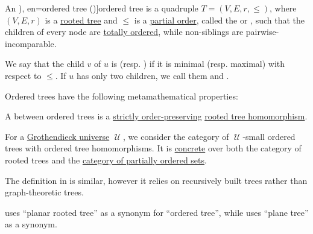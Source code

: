 \begin{definition}\label{def:ordered_tree}\mimprovised
  An \term[ru=упорядоченное дерево (\cite[\S 9.3.5]{Новиков2013ДискретнаяМатематика}), en=ordered tree (\cite[573]{Stanley2012EnumerativeCombinatoricsVol1})]{ordered tree} is a quadruple \( T = (V, E, r, \leq) \), where \( (V, E, r) \) is a \hyperref[def:rooted_tree]{rooted tree} and \( {\leq} \) is a \hyperref[def:partially_ordered_set]{partial order}, called the  or , such that the children of every node are \hyperref[def:partial_order_chain/chain]{totally ordered}, while non-siblings are pairwise-incomparable.

  \begin{thmenum}[series=def:ordered_tree]
     We say that the child \( v \) of \( u \) is  (resp. ) if it is minimal (resp. maximal) with respect to \( {\leq} \). If \( u \) has only two children, we call them  and .
  \end{thmenum}

  Ordered trees have the following metamathematical properties:
  \begin{thmenum}
     A  between ordered trees is a \hyperref[def:order_function/preserving]{strictly order-preserving} \hyperref[def:rooted_tree/homomorphism]{rooted tree homomorphism}.

     For a \hyperref[def:grothendieck_universe]{Grothendieck universe} \( \mscrU \), we consider the category of \( \mscrU \)-small ordered trees with ordered tree homomorphisms. It is \hyperref[def:concrete_category]{concrete} over both the category of rooted trees and the \hyperref[def:partially_ordered_set]{category of partially ordered sets}.
  \end{thmenum}
\end{definition}
\begin{comments}
  \item The definition in \cite[573]{Stanley2012EnumerativeCombinatoricsVol1} is similar, however it relies on recursively built trees rather than graph-theoretic trees.

  \item {} uses \enquote{planar rooted tree} as a synonym for \enquote{ordered tree}, while \cite[573]{Stanley2012EnumerativeCombinatoricsVol1} uses \enquote{plane tree} as a synonym.
\end{comments}

